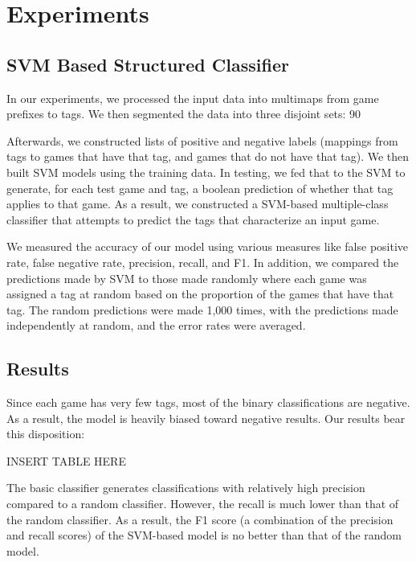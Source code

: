 \documentclass[11pt]{article}
\begin{document}
\section{Experiments}
\subsection{SVM Based Structured Classifier}


In our experiments, we processed the input data into multimaps from game prefixes to tags. We then segmented the data into three disjoint sets: 90%

Afterwards, we constructed lists of positive and negative labels (mappings from tags to games that have that tag, and games that do not have that tag). We then built SVM models using the training data. In testing, we fed that to the SVM to generate, for each test game and tag, a boolean prediction of whether that tag applies to that game. As a result, we constructed a SVM-based multiple-class classifier that attempts to predict the tags that characterize an input game.

We measured the accuracy of our model using various measures like false positive rate, false negative rate, precision, recall, and F1. In addition, we compared the predictions made by SVM to those made randomly where each game was assigned a tag at random based on the proportion of the games that have that tag. The random predictions were made 1,000 times, with the predictions made independently at random, and the error rates were averaged.

\subsection{Results}
Since each game has very few tags, most of the binary classifications are negative. As a result, the model is heavily biased toward negative results. Our results bear this disposition:

INSERT TABLE HERE

The basic classifier generates classifications with relatively high precision compared to a random classifier. However, the recall is much lower than that of the random classifier. As a result, the F1 score (a combination of the precision and recall scores) of the SVM-based model is no better than that of the random model.
\end{document}
